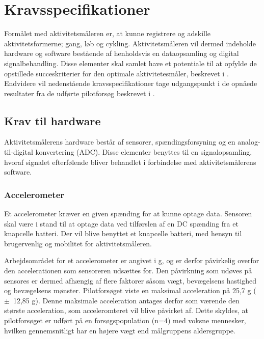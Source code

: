 \section{Kravsspecifikationer}
Formålet med aktivitetsmåleren er, at kunne registrere og adskille aktivitetsformerne; gang, løb og cykling. Aktivitetsmåleren vil dermed indeholde hardware og software bestående af henholdsvis en dataopsamling og digital signalbehandling. Disse elementer skal samlet have et potentiale til at opfylde de opstillede succeskriterier for den optimale aktivitetesmåler, beskrevet i . \newline
Endvidere vil nedenstående kravsspecifikationer tage udgangspunkt i de opnåede resultater fra de udførte pilotforsøg beskrevet i  .

\subsection{Krav til hardware}
Aktivitetsmålerens hardware består af sensorer, spændingsforsyning og en analog-til-digital konvertering (ADC). Disse elementer benyttes til en signalopsamling, hvoraf signalet efterfølende bliver behandlet i forbindelse med aktivitetsmålerens software.

\subsubsection{Accelerometer}
Et accelerometer kræver en given spænding for at kunne optage data. Sensoren skal være i stand til at optage data ved tilførslen af en DC spænding fra et knapcelle batteri. Der vil blive benyttet et knapcelle batteri, med hensyn til brugervenlig og mobilitet for aktivitetsmåleren.\newline

Arbejdsområdet for et accelerometer er angivet i g, og er derfor påvirkelig overfor den accelerationen som sensoreren udsættes for. Den påvirkning som udøves på sensores er dermed afhængig af flere faktorer såsom vægt, bevægelsens hastighed og bevægelsens mønster. \newline
Pilotforsøget viste en maksimal acceleration på 25,7 g ($\pm$~12,85 g). Denne maksimale acceleration antages derfor som værende den største acceleration, som acceleromteret vil blive påvirket af. Dette skyldes, at pilotforsøget er udført på en forsøgspopulation (n=4) med voksne mennesker, hvilken gennemsnitligt har en højere vægt end målgruppens aldersgruppe. 


